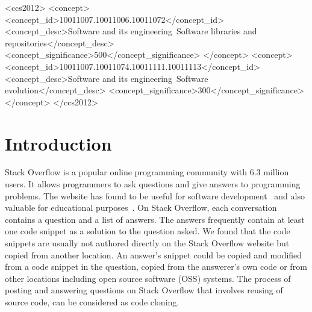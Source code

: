 \documentclass[sigconf,review, anonymous]{acmart}
\begin{document}
\begin{CCSXML}
	<ccs2012>
	<concept>
	<concept_id>10011007.10011006.10011072</concept_id>
	<concept_desc>Software and its engineering~Software libraries and repositories</concept_desc>
	<concept_significance>500</concept_significance>
	</concept>
	<concept>
	<concept_id>10011007.10011074.10011111.10011113</concept_id>
	<concept_desc>Software and its engineering~Software evolution</concept_desc>
	<concept_significance>300</concept_significance>
	</concept>
	</ccs2012>
\end{CCSXML}



	
\maketitle

\section{Introduction}

Stack Overflow is a popular online programming community with 6.3
million users. It allows programmers to ask questions and give answers
to programming problems. The website has found to be useful for
software
development~\cite{Ponzanelli2013,Ponzanelli2014,Keivanloo2014,Park2014,
  Stolee2014,Subramanian2013,Diamantopoulos2015,Treude2016} and also
valuable for educational purposes~\cite{Nasehi2012}. On Stack
Overflow, each conversation contains a question and a list of
answers. The answers frequently contain at least one code snippet as
a solution to the question asked. We found that the code snippets are
usually not authored directly on the Stack Overflow website but copied
from another location. An answer's snippet could be copied and modified
from a code snippet in the question, copied from the answerer's own
code or from other locations including open source software (OSS)
systems. The process of posting and answering questions on Stack
Overflow that involves reusing of source code, can be considered as
code cloning.
\end{document}
